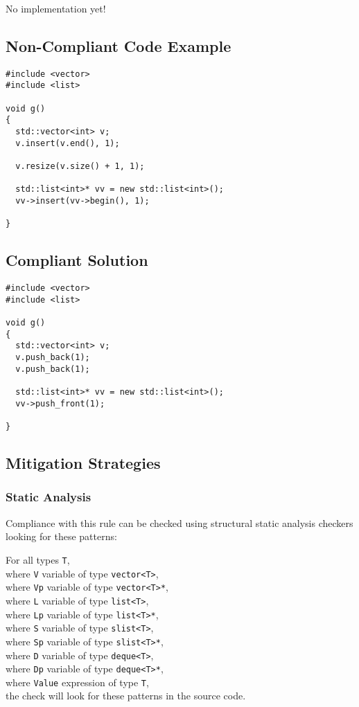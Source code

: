    No implementation yet!

\subsection{Non-Compliant Code Example}

\begin{verbatim}
#include <vector>
#include <list>

void g()
{
  std::vector<int> v;
  v.insert(v.end(), 1);

  v.resize(v.size() + 1, 1);

  std::list<int>* vv = new std::list<int>();
  vv->insert(vv->begin(), 1);

}
\end{verbatim}

\subsection{Compliant Solution}

\begin{verbatim}
#include <vector>
#include <list>

void g()
{
  std::vector<int> v;
  v.push_back(1);
  v.push_back(1);

  std::list<int>* vv = new std::list<int>();
  vv->push_front(1);

}
\end{verbatim}

\subsection{Mitigation Strategies}
\subsubsection{Static Analysis}

Compliance with this rule can be checked using structural static
analysis checkers looking for these patterns:

For all types \texttt{T},\\
where \texttt{V} variable of type \texttt{vector<T>},\\
where \texttt{Vp} variable of type \texttt{vector<T>*},\\
where \texttt{L} variable of type \texttt{list<T>},\\
where \texttt{Lp} variable of type \texttt{list<T>*},\\
where \texttt{S} variable of type \texttt{slist<T>},\\
where \texttt{Sp} variable of type \texttt{slist<T>*},\\
where \texttt{D} variable of type \texttt{deque<T>},\\
where \texttt{Dp} variable of type \texttt{deque<T>*},\\
where \texttt{Value} expression of type \texttt{T},\\
the check will look for these patterns in the source code.

